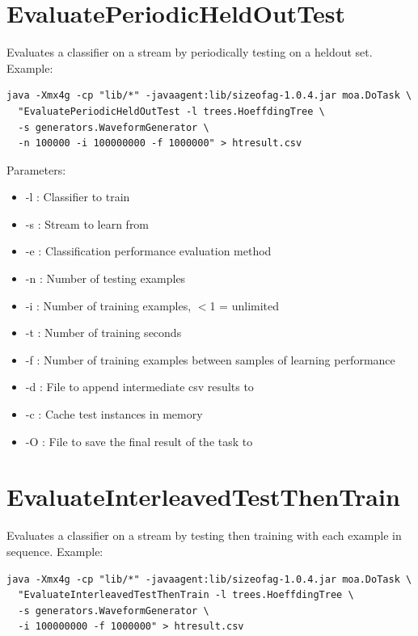\documentclass[a4paper,12pt,twoside]{book}
\begin{document}
\section{EvaluatePeriodicHeldOutTest}

Evaluates a classifier on a stream by periodically testing on a heldout set.
Example:
\begin{footnotesize}\begin{verbatim}
java -Xmx4g -cp "lib/*" -javaagent:lib/sizeofag-1.0.4.jar moa.DoTask \
  "EvaluatePeriodicHeldOutTest -l trees.HoeffdingTree \
  -s generators.WaveformGenerator \
  -n 100000 -i 100000000 -f 1000000" > htresult.csv
\end{verbatim}\end{footnotesize}

Parameters:
\begin{itemize}
\item -l : Classifier to train
\item -s : Stream to learn from
\item -e : Classification performance evaluation method
\item -n : Number of testing examples
\item -i : Number of training examples, $<$1 = unlimited
\item -t : Number of training seconds
\item -f : Number of training examples between samples of learning performance
\item -d : File to append intermediate csv results to
\item -c : Cache test instances in memory
\item -O : File to save the final result of the task to
\end{itemize}

\section{EvaluateInterleavedTestThenTrain}
Evaluates a classifier on a stream by testing then training with each example in sequence.
Example:
\begin{footnotesize}\begin{verbatim}
java -Xmx4g -cp "lib/*" -javaagent:lib/sizeofag-1.0.4.jar moa.DoTask \
  "EvaluateInterleavedTestThenTrain -l trees.HoeffdingTree \
  -s generators.WaveformGenerator \
  -i 100000000 -f 1000000" > htresult.csv
\end{verbatim}
\end{footnotesize}
\end{document}
